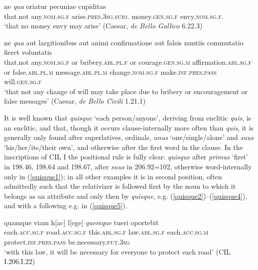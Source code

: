 \begin{exe}
\ex
\gll ne \emph{qua} oriatur pecuniae cupiditas\\
that.not any.\textsc{nom.sg.f} arise.\textsc{pres.3sg.subj.} money.\textsc{gen.sg.f} envy.\textsc{nom.sg.f.}\\
\trans `that no money envy may arise' (Caesar, \textit{de Bello Gallico} 6.22.3) 
\label{indef.enclitic8}
\end{exe}

\begin{exe}
\ex
\gll ne \emph{qua} aut largitionibus aut animi confirmatione aut falsis nuntiis commutatio fieret voluntatis\\
that.not any.\textsc{nom.sg.f} or bribery.\textsc{abl.pl.f} or courage.\textsc{gen.sg.m} affirmation.\textsc{abl.sg.f} or false.\textsc{abl.pl.m} message.\textsc{abl.pl.m} change.\textsc{nom.sg.f} make.\textsc{inf.pres.pass} will.\textsc{gen.sg.f}\\
\trans `that not any change of will may take place due to bribery or encouragement or false messages' (Caesar, \textit{de Bello Civili} 1.21.1) 
\label{indef.enclitic9}
\end{exe}%

It is well known that \emph{quisque} `each person/anyone', deriving from enclitic \emph{quis}, is an enclitic, and that, though it occurs clause-internally more often than \emph{quis}, it is generally only found after superlatives, ordinals, \emph{unus} `one/single/alone' and \emph{suus} `his/her/its/their own', and otherwise after the first word in the clause. In the inscriptions of CIL I the positional rule is fully clear: \emph{quisque} after \emph{primus} `first' in 198.46, 198.64 and 198.67, after \emph{suus} in 206.92=102, otherwise word-internally only in (\ref{quisque1}); in all other examples it is in second position, often admittedly such that the relativizer is followed first by the noun to which it belongs as an attribute and only then by \emph{quisque}, e.g. (\ref{quisque2})--(\ref{quisque4}), and with a following  e.g. in (\ref{quisque5}).

\begin{exe}
\ex
\gll quamque viam h{[}ac{]} l{[}ege{]} \emph{quemque} tueri oportebit\\
each.\textsc{acc.sg.f} road.\textsc{acc.sg.f} this.\textsc{abl.sg.f} law.\textsc{abl.sg.f} each.\textsc{acc.sg.m} protect.\textsc{inf.pres.pass} be.necessary.\textsc{fut.3sg}\\
\trans `with this law, it will be necessary for everyone to protect each road' (CIL I.206.I.22) 
\label{quisque1}
\end{exe}

